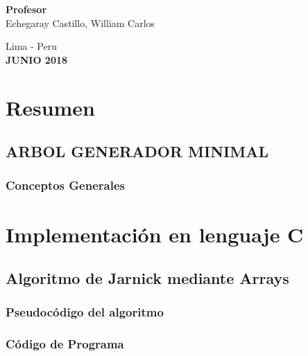\documentclass[a4paper]{article}
\begin{document}
\begin{titlepage}
\begin{center}
\vspace*{0.4in}
\begin{large}
{\bf Profesor} 
\vspace*{0.1in}
\\Echegaray Castillo, William Carlos
\end{large}

\end{center}
\begin{center}
\begin{large}
\vspace*{0.2in}
Lima - Peru\\
{\bf JUNIO 2018}
\end{large}
\end{center}
\end{titlepage}

\pagebreak
\tableofcontents
\pagebreak

\section{Resumen}
\subsection{ARBOL GENERADOR MINIMAL}
\subsubsection{Conceptos Generales}
\section{Implementaci\'on en lenguaje C}
\subsection{Algoritmo de Jarnick mediante Arrays}
\subsubsection{Pseudoc\'odigo del algoritmo}
\subsubsection{C\'odigo de Programa}
\end{document}
